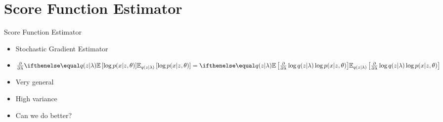 \documentclass[14pt, aspectratio=169]{beamer}
\begin{document}
%
%

\section{Score Function Estimator}
\frame{\tableofcontents[currentsection]}

\begin{frame}{Score Function Estimator}
\begin{itemize}
\item Stochastic Gradient Estimator
\item $ \pdv{\lambda}\E[q(z|\lambda)]{\log p(x|z,\theta)} = \E[q(z|\lambda)] {\pdv{\lambda}\log q(z|\lambda) \log p(x|z,\theta)} $
\item Very general
\item High variance
\pause
\item Can we do better?
\end{itemize}
\end{frame}
\end{document}
